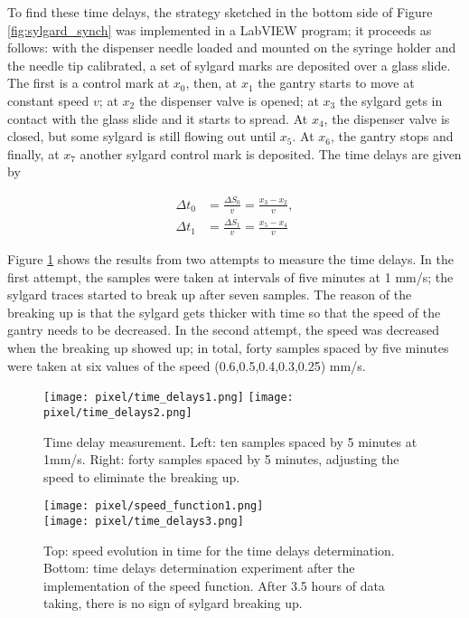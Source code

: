 To find these time delays, the strategy sketched in the bottom side of Figure \ref{fig:sylgard_synch} was implemented in a LabVIEW program; it proceeds as follows: with the dispenser needle loaded and mounted on the syringe holder and the needle tip calibrated, a set of sylgard marks are deposited over a glass slide. The first is a control mark at $x_0$, then, at $x_1$ the gantry starts to move at constant speed $v$; at $x_2$ the dispenser valve is opened; at $x_3$ the sylgard gets in contact with the glass slide and it starts to spread. At $x_4$, the dispenser valve is closed, but some sylgard is still flowing out until $x_5$. At $x_6$, the gantry stops and finally, at $x_7$ another sylgard control mark is deposited. The time delays are given by 

\begin{align}
  \Delta t_0&=\frac{\Delta S_0}{v}=\frac{x_3-x_2}{v},\\
  \Delta t_1&=\frac{\Delta S_1}{v}=\frac{x_5-x_4}{v}
\end{align}

Figure \ref{fig:delays_measure} shows the results from two attempts to measure the time delays. In the first attempt, the samples were taken at intervals of five minutes at 1 mm/s; the sylgard traces started to break up after seven samples. The reason of the breaking up is that the sylgard gets thicker with time so that the speed of the gantry needs to be decreased. In the second attempt, the speed was decreased when the breaking up showed up; in total, forty samples spaced by five minutes were taken at six values of the speed (0.6,0.5,0.4,0.3,0.25) mm/s.

\begin{figure}[h]
  \centering
    \texttt{[image: pixel/time\_delays1.png]} 
    \texttt{[image: pixel/time\_delays2.png]}
    \caption[Time delay measurements.]{Time delay measurement. Left: ten samples spaced by 5 minutes at 1mm/s. Right: forty samples spaced by 5 minutes, adjusting the speed to eliminate the breaking up.}\label{fig:delays_measure}
\end{figure}

\begin{figure}[h]
  \centering
    \texttt{[image: pixel/speed\_function1.png]}\\ 
    \texttt{[image: pixel/time\_delays3.png]}
    \caption[Speed function for sylgard deposition.]{Top: speed evolution in time for the time delays determination. Bottom: time delays determination experiment after the implementation of the speed function. After 3.5 hours of data taking, there is no sign of sylgard breaking up.}\label{fig:speed_function}
\end{figure}

